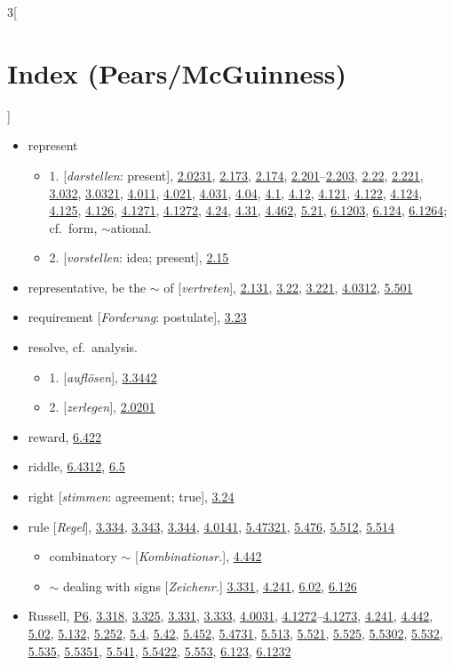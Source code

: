 \documentclass[oneside,openany,12pt]{book}
\newcommand{\indexentry}[1]{\item #1}
\newcommand{\indexsubentry}[1]{\begin{itemize} \item #1 \end{itemize}}
\newcommand{\indexref}[1]{\hyperlink{prop#1}{#1}}
\begin{document}
\begin{multicols}{3}[\section*{Index (Pears/McGuinness)}]
\begin{itemize}
\indexentry{represent}

   \indexsubentry{1. [\textit{darstellen}: present], \indexref{2.0231}, \indexref{2.173}, \indexref{2.174}, \indexref{2.201}--\indexref{2.203}, \indexref{2.22}, \indexref{2.221}, \indexref{3.032}, \indexref{3.0321}, \indexref{4.011}, \indexref{4.021}, \indexref{4.031}, \indexref{4.04}, \indexref{4.1}, \indexref{4.12}, \indexref{4.121}, \indexref{4.122}, \indexref{4.124}, \indexref{4.125}, \indexref{4.126}, \indexref{4.1271}, \indexref{4.1272}, \indexref{4.24}, \indexref{4.31}, \indexref{4.462}, \indexref{5.21}, \indexref{6.1203}, \indexref{6.124}, \indexref{6.1264}; cf.\ form, $\sim$ational.}

   \indexsubentry{2. [\textit{vorstellen}: idea; present], \indexref{2.15}}

\indexentry{representative, be the $\sim$ of [\textit{vertreten}], \indexref{2.131}, \indexref{3.22}, \indexref{3.221}, \indexref{4.0312}, \indexref{5.501}}

\indexentry{requirement [\textit{Forderung}: postulate], \indexref{3.23}}

\indexentry{resolve, cf.\ analysis.}

   \indexsubentry{1. [\textit{aufl{\"o}sen}], \indexref{3.3442}}

   \indexsubentry{2. [\textit{zerlegen}], \indexref{2.0201}}

\indexentry{reward, \indexref{6.422}}

\indexentry{riddle, \indexref{6.4312}, \indexref{6.5}}

\indexentry{right [\textit{stimmen}: agreement; true], \indexref{3.24}}

\indexentry{rule [\textit{Regel}], \indexref{3.334}, \indexref{3.343}, \indexref{3.344}, \indexref{4.0141}, \indexref{5.47321}, \indexref{5.476}, \indexref{5.512}, \indexref{5.514}}

   \indexsubentry{combinatory $\sim$ [\textit{Kombinationsr.}], \indexref{4.442}}

   \indexsubentry{$\sim$ dealing with signs [\textit{Zeichenr.}] \indexref{3.331}, \indexref{4.241}, \indexref{6.02}, \indexref{6.126}}

\indexentry{Russell, \hyperlink{pref6}{P6}, \indexref{3.318}, \indexref{3.325}, \indexref{3.331}, \indexref{3.333}, \indexref{4.0031}, \indexref{4.1272}--\indexref{4.1273}, \indexref{4.241}, \indexref{4.442}, \indexref{5.02}, \indexref{5.132}, \indexref{5.252}, \indexref{5.4}, \indexref{5.42}, \indexref{5.452}, \indexref{5.4731}, \indexref{5.513}, \indexref{5.521}, \indexref{5.525}, \indexref{5.5302}, \indexref{5.532}, \indexref{5.535}, \indexref{5.5351}, \indexref{5.541}, \indexref{5.5422}, \indexref{5.553}, \indexref{6.123}, \indexref{6.1232}}


\end{itemize}
\end{multicols}
\end{document}
